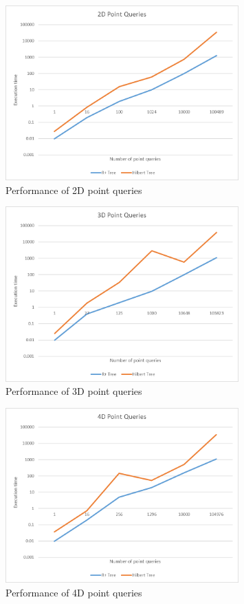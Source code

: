 \documentclass[11pt, a4paper, oneside]{article}
\begin{document}
\begin{enumerate}
\begin{figure}[H]
  \centering
    \includegraphics[width=0.8\textwidth]{img/point2d}
      \caption{Performance of 2D point queries}
  \label{fig:point2D}
\end{figure}

\begin{figure}[H]
  \centering
    \includegraphics[width=0.8\textwidth]{img/point3d}
      \caption{Performance of 3D point queries}
  \label{fig:point3D}
\end{figure}

\begin{figure}[H]
  \centering
    \includegraphics[width=0.8\textwidth]{img/point4d}
      \caption{Performance of 4D point queries}
  \label{fig:point4D}
\end{figure}


\end{enumerate}
\end{document}
